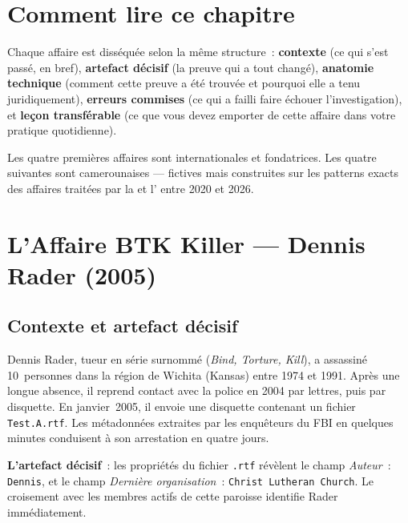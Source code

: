 \bigskip

\section*{Comment lire ce chapitre}

Chaque affaire est disséquée selon la même structure~: \textbf{contexte} (ce
qui s'est passé, en bref), \textbf{artefact décisif} (la preuve qui a tout
changé), \textbf{anatomie technique} (comment cette preuve a été trouvée et
pourquoi elle a tenu juridiquement), \textbf{erreurs commises} (ce qui a failli
faire échouer l'investigation), et \textbf{leçon transférable} (ce que vous
devez emporter de cette affaire dans votre pratique quotidienne).

\medskip

Les quatre premières affaires sont internationales et fondatrices. Les quatre
suivantes sont camerounaises --- fictives mais construites sur les patterns
exacts des affaires traitées par la  et l' entre
2020 et 2026.

\separateur

\section{L'Affaire BTK Killer --- Dennis Rader (2005)}
\label{sec:btk}

\subsection{Contexte et artefact décisif}

Dennis Rader, tueur en série surnommé  (\textit{Bind, Torture,
Kill}), a assassiné 10~personnes dans la région de Wichita (Kansas) entre
1974 et 1991. Après une longue absence, il reprend contact avec la police en
2004 par lettres, puis par disquette. En janvier~2005, il envoie une disquette
contenant un fichier \texttt{Test.A.rtf}. Les métadonnées extraites par les
enquêteurs du FBI en quelques minutes conduisent à son arrestation en
quatre jours.

\medskip

\textbf{L'artefact décisif}~: les propriétés du fichier \texttt{.rtf} révèlent
le champ \textit{Auteur}~: \texttt{Dennis}, et le champ
\textit{Dernière organisation}~: \texttt{Christ Lutheran Church}. Le
croisement avec les membres actifs de cette paroisse identifie Rader
immédiatement.

